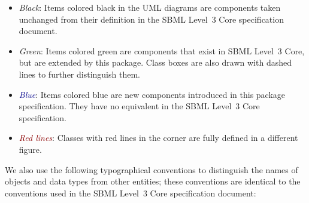 \documentclass[draftspec]{sbmlpkgspec}
\begin{document}
\begin{itemize}

\item[\raisebox{2.75pt}{\colorbox{black}{\rule{0.8pt}{0.8pt}}}]
  \emph{Black}: Items colored black in the UML diagrams are components
  taken unchanged from their definition in the SBML Level~3 Core
  specification document.

\item[\raisebox{2.75pt}{\colorbox{mediumgreen}{\rule{0.8pt}{0.8pt}}}]
  \emph{\textcolor{mediumgreen}{Green}}: Items colored green are
  components that exist in SBML Level~3 Core, but are extended by this
  package.  Class boxes are also drawn with dashed lines to further
  distinguish them.

\item[\raisebox{2.75pt}{\colorbox{darkblue}{\rule{0.8pt}{0.8pt}}}]
  \emph{\textcolor{darkblue}{Blue}}: Items colored blue are new
  components introduced in this package specification.  They have no
  equivalent in the SBML Level~3 Core specification.

\item[\raisebox{2.75pt}{\colorbox{red}{\rule{0.8pt}{0.8pt}}}]
  \emph{\textcolor{DarkRed}{Red lines}}: Classes with red lines in the corner are fully defined in a different figure.

\end{itemize}

We also use the following typographical conventions to distinguish the
names of objects and data types from other entities; these conventions
are identical to the conventions used in the SBML Level~3 Core specification
document:
\end{document}
